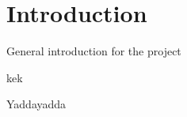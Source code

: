 \chapter{Introduction} \label{ch:Introduction}
General introduction for the project

kek


Yaddayadda

